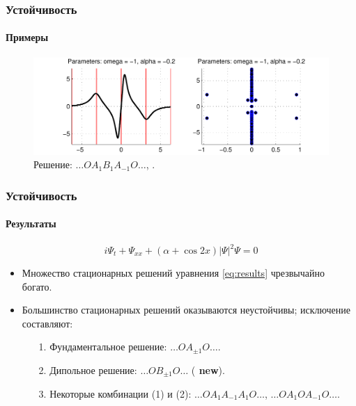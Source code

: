 \documentclass [10pt] {beamer}
\begin{document}
\begin{frame}
	\frametitle{Устойчивость}
	\framesubtitle{Примеры}
	
	\begin{figure}
		\includegraphics[width=1\textwidth]{pic/example_8.pdf}
		\caption{Решение: $\dots O A_1 B_1 A_{-1} O \dots$, {\it \color{fireenginered}{осцилляторно неустойчиво}}.}
		\label{pic:example_8}
	\end{figure}
\end{frame}

\begin{frame}
	\frametitle{Устойчивость}
	\framesubtitle{Результаты}
	
	\begin{equation}
		i \Psi_t + \Psi_{xx} + (\alpha + \cos 2x) |\Psi|^2 \Psi = 0
		\label{eq:results}	
	\end{equation}
	
	\begin{itemize}
		\item Множество стационарных решений уравнения \eqref{eq:results} чрезвычайно богато.
		\item Большинство стационарных решений оказываются неустойчивы; исключение составляют:
			\begin{enumerate}
				\item[1.] Фундаментальное решение: $\dots O A_{\pm 1} O \dots$.
				\item[2.] Дипольное решение: $\dots O B_{\pm 1} O \dots$ ({\bf {\color{red} new}}).
				\item[3.] Некоторые комбинации {\color{ceruleanblue} (1)} и {\color{ceruleanblue} (2)}: $\dots O A_1 A_{-1} A_1 O \dots$, $\dots O A_1 O A_{-1} O \dots$.
			\end{enumerate}
	\end{itemize}
\end{frame}
\end{document}
